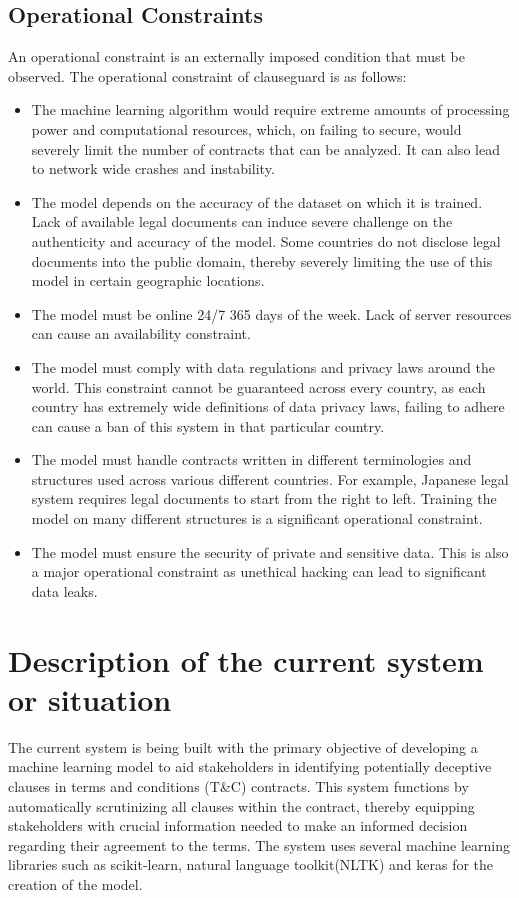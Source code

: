 \subsection{Operational Constraints}
An operational constraint is an externally imposed condition that must be observed. The operational constraint of clauseguard is as follows: 
\begin{itemize}
    \item The machine learning algorithm would require extreme amounts of processing power and computational resources, which, on failing to secure, would severely limit the number of contracts that can be analyzed. It can also lead to network wide crashes and instability. 
    \item The model depends on the accuracy of the dataset on which it is trained. Lack of available legal documents can induce severe challenge on the authenticity and accuracy of the model. Some countries do not disclose legal documents into the public domain, thereby severely limiting the use of this model in certain geographic locations. 
    \item The model must be online 24/7 365 days of the week. Lack of server resources can cause an availability constraint. 
    \item The model must comply with data regulations  and privacy laws around the world. This constraint cannot be guaranteed across every country, as each country has extremely wide definitions of data privacy laws, failing to adhere can cause a ban of this system in that particular country. 
    \item The model must handle contracts written in different terminologies and structures used across various different countries. For example, Japanese legal system requires legal documents to start from the right to left. Training the model on many different structures is a significant operational constraint. 
    \item The model must ensure the security of private and sensitive data. This is also a major operational constraint as unethical hacking can lead to significant data leaks. 
    
\end{itemize}

\section{Description of the current system or situation \label{Section::Description of the current system or situation}}
The current system is being built with the primary objective of developing a machine learning model to aid stakeholders in identifying potentially deceptive clauses in terms and conditions (T\&C) contracts. This system functions by automatically scrutinizing all clauses within the contract, thereby equipping stakeholders with crucial information needed to make an informed decision regarding their agreement to the terms.
The system uses several machine learning libraries such as scikit-learn, natural language toolkit(NLTK) and keras for the creation of the model. 


